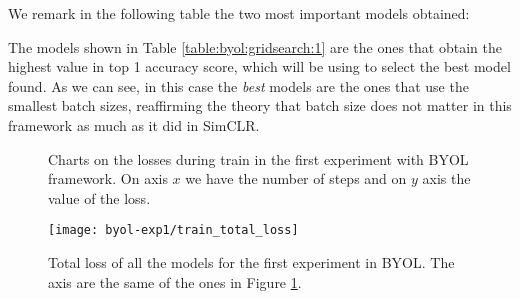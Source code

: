 We remark in the following table the two most important models obtained:

\begin{table}[H]
    \caption{Most important results for BYOL's experiment on the influence of batch size.}
    \label{table:byol:gridsearch:1}
    \end{table}

The models shown in Table \ref{table:byol:gridsearch:1} are the ones that obtain the highest value in top 1 accuracy score, which will be using to select the best model found. As we can see, in this case the \emph{best} models are the ones that use the smallest batch sizes, reaffirming the theory that batch size does not matter in this framework as much as it did in SimCLR.

\begin{figure}[htp] 
    \centering
    \hfill%
        \caption{Charts on the losses during train in the first experiment with BYOL framework. On axis $x$ we have the number of steps and on $y$ axis the value of the loss.}
        \label{fig:byol:exp1:both:losses}
\end{figure}

\begin{figure}[H]
\centering
\texttt{[image: byol-exp1/train\_total\_loss]}%
\caption{Total loss of all the models for the first experiment in BYOL. The axis are the same of the ones in Figure \ref{fig:byol:exp1:both:losses}. }
\label{fig:byol:total:loss:exp1}%
\end{figure}

